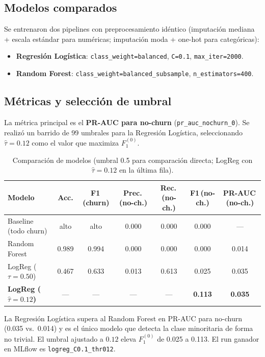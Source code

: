 \documentclass[11pt]{article}
\begin{document}
\subsection*{Modelos comparados}

Se entrenaron dos pipelines con preprocesamiento idéntico
(imputación mediana + escala estándar para numéricas; imputación moda +
one-hot para categóricas):

\begin{itemize}[itemsep=1pt, topsep=2pt]
  \item \textbf{Regresión Logística}: \texttt{class\_weight=balanced},
        \texttt{C=0.1}, \texttt{max\_iter=2000}.
  \item \textbf{Random Forest}: \texttt{class\_weight=balanced\_subsample},
        \texttt{n\_estimators=400}.
\end{itemize}

\subsection*{Métricas y selección de umbral}

La métrica principal es el \textbf{PR-AUC para no-churn}
(\texttt{pr\_auc\_nochurn\_0}). Se realizó un barrido de 99 umbrales para
la Regresión Logística, seleccionando $\hat{\tau}=0.12$ como el valor que
maximiza $F_1^{(0)}$.

\begin{table}[H]
\centering
\caption{Comparación de modelos (umbral 0.5 para comparación directa; LogReg con
$\hat{\tau}=0.12$ en la última fila).}
\small
\begin{tabular}{lcccccc}
\toprule
\textbf{Modelo} & \textbf{Acc.} & \textbf{F1\,(churn)} &
\textbf{Prec.\,(no-ch.)} & \textbf{Rec.\,(no-ch.)} &
\textbf{F1\,(no-ch.)} & \textbf{PR-AUC\,(no-ch.)} \\
\midrule
Baseline (todo churn)   & alto  & alto & 0.000 & 0.000 & 0.000 & — \\
Random Forest           & 0.989 & 0.994 & 0.000 & 0.000 & 0.000 & 0.014 \\
LogReg ($\tau=0.50$)    & 0.467 & 0.633 & 0.013 & 0.613 & 0.025 & 0.035 \\
\textbf{LogReg ($\hat\tau=0.12$)} & — & — & — & — & \textbf{0.113} & \textbf{0.035} \\
\bottomrule
\end{tabular}
\end{table}

La Regresión Logística supera al Random Forest en PR-AUC para no-churn
(0.035 vs.\ 0.014) y es el único modelo que detecta la clase minoritaria de
forma no trivial. El umbral ajustado a $0.12$ eleva $F_1^{(0)}$ de 0.025 a
0.113. El run ganador en MLflow es \texttt{logreg\_C0.1\_thr012}.
\end{document}
